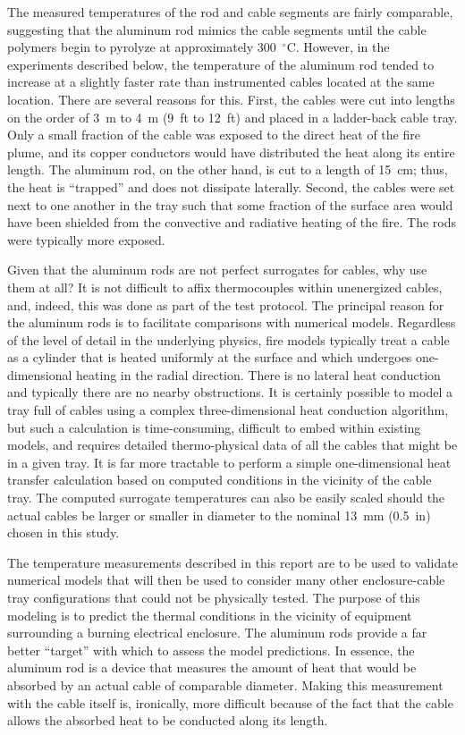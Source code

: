 The measured temperatures of the rod and cable segments are fairly comparable, suggesting that the aluminum rod mimics the cable segments until the cable polymers begin to pyrolyze at approximately 300~$^\circ$C. However, in the experiments described below, the temperature of the aluminum rod tended to increase at a slightly faster rate than instrumented cables located at the same location. There are several reasons for this. First, the cables were cut into lengths on the order of 3~m to 4~m (9~ft to 12~ft) and placed in a ladder-back cable tray. Only a small fraction of the cable was exposed to the direct heat of the fire plume, and its copper conductors would have distributed the heat along its entire length. The aluminum rod, on the other hand, is cut to a length of 15~cm; thus, the heat is ``trapped'' and does not dissipate laterally. Second, the cables were set next to one another in the tray such that some fraction of the surface area would have been shielded from the convective and radiative heating of the fire. The rods were typically more exposed.

Given that the aluminum rods are not perfect surrogates for cables, why use them at all? It is not difficult to affix thermocouples within unenergized cables, and, indeed, this was done as part of the test protocol. The principal reason for the aluminum rods is to facilitate comparisons with numerical models. Regardless of the level of detail in the underlying physics, fire models typically treat a cable as a cylinder that is heated uniformly at the surface and which undergoes one-dimensional heating in the radial direction. There is no lateral heat conduction and typically there are no nearby obstructions. It is certainly possible to model a tray full of cables using a complex three-dimensional heat conduction algorithm, but such a calculation is time-consuming, difficult to embed within existing models, and requires detailed thermo-physical data of all the cables that might be in a given tray. It is far more tractable to perform a simple one-dimensional heat transfer calculation based on computed conditions in the vicinity of the cable tray. The computed surrogate temperatures can also be easily scaled should the actual cables be larger or smaller in diameter to the nominal 13~mm (0.5~in) chosen in this study.

The temperature measurements described in this report are to be used to validate numerical models that will then be used to consider many other enclosure-cable tray configurations that could not be physically tested. The purpose of this modeling is to predict the thermal conditions in the vicinity of equipment surrounding a burning electrical enclosure. The aluminum rods provide a far better ``target'' with which to assess the model predictions. In essence, the aluminum rod is a device that measures the amount of heat that would be absorbed by an actual cable of comparable diameter. Making this measurement with the cable itself is, ironically, more difficult because of the fact that the cable allows the absorbed heat to be conducted along its length.

